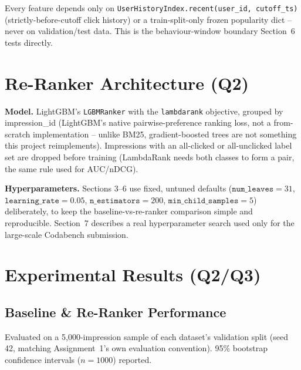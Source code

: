 \documentclass[11pt,a4paper]{article}
\begin{document}
Every feature depends only on \texttt{UserHistoryIndex.recent(user\_id, cutoff\_ts)}
(strictly-before-cutoff click history) or a train-split-only frozen popularity dict --
never on validation/test data. This is the behaviour-window boundary Section~6 tests
directly.

\section{Re-Ranker Architecture (Q2)}

\textbf{Model.} LightGBM's \texttt{LGBMRanker} with the \texttt{lambdarank} objective,
grouped by impression\_id (LightGBM's native pairwise-preference ranking loss, not a
from-scratch implementation -- unlike BM25, gradient-boosted trees are not something
this project reimplements). Impressions with an all-clicked or all-unclicked label set
are dropped before training (LambdaRank needs both classes to form a pair, the same
rule used for AUC/nDCG).

\textbf{Hyperparameters.} Sections 3--6 use fixed, untuned defaults
($\texttt{num\_leaves}{=}31$, $\texttt{learning\_rate}{=}0.05$,
$\texttt{n\_estimators}{=}200$, $\texttt{min\_child\_samples}{=}5$) deliberately, to
keep the baseline-vs-re-ranker comparison simple and reproducible. Section~7 describes
a real hyperparameter search used only for the large-scale Codabench submission.

\section{Experimental Results (Q2/Q3)}

\subsection{Baseline \& Re-Ranker Performance}

Evaluated on a 5{,}000-impression sample of each dataset's validation split (seed 42,
matching Assignment~1's own evaluation convention). 95\% bootstrap confidence
intervals ($n=1000$) reported.
\end{document}
